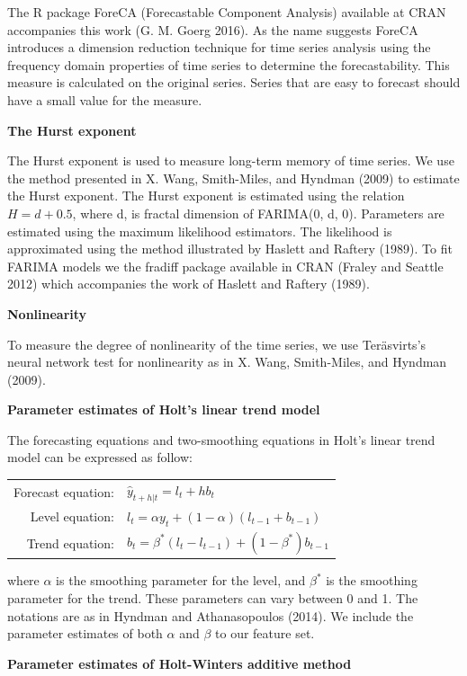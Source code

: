 \documentclass[11pt,]{article}
\theoremstyle{definition}
\theoremstyle{definition}
\theoremstyle{definition}
\theoremstyle{remark}
\begin{document}
The R package ForeCA (Forecastable Component Analysis) available at CRAN
accompanies this work (G. M. Goerg 2016). As the name suggests ForeCA
introduces a dimension reduction technique for time series analysis
using the frequency domain properties of time series to determine the
forecastability. This measure is calculated on the original series.
Series that are easy to forecast should have a small value for the
measure.

\textbf{The Hurst exponent}

The Hurst exponent is used to measure long-term memory of time series.
We use the method presented in X. Wang, Smith-Miles, and Hyndman (2009)
to estimate the Hurst exponent. The Hurst exponent is estimated using
the relation \(H=d+0.5\), where d, is fractal dimension of FARIMA(0, d,
0). Parameters are estimated using the maximum likelihood estimators.
The likelihood is approximated using the method illustrated by Haslett
and Raftery (1989). To fit FARIMA models we the fradiff package
available in CRAN (Fraley and Seattle 2012) which accompanies the work
of Haslett and Raftery (1989).

\textbf{Nonlinearity}

To measure the degree of nonlinearity of the time series, we use
Teräsvirts's neural network test for nonlinearity as in X. Wang,
Smith-Miles, and Hyndman (2009).

\textbf{Parameter estimates of Holt's linear trend model}

The forecasting equations and two-smoothing equations in Holt's linear
trend model can be expressed as follow:

\begin{table}[!h]
\centering
\begin{tabular}{rl}
Forecast equation: &  $\hat{y}_{t+h|t}=l_t + hb_t$ \\
 Level equation: & $l_t = \alpha y_t + (1-\alpha)(l_{t-1}+b_{t-1})$ \\
Trend equation: &  $b_t=\beta^*(l_t-l_{t-1})+(1-\beta^*)b_{t-1}$
\end{tabular}
\end{table}

where \(\alpha\) is the smoothing parameter for the level, and
\(\beta^*\) is the smoothing parameter for the trend. These parameters
can vary between 0 and 1. The notations are as in Hyndman and
Athanasopoulos (2014). We include the parameter estimates of both
\(\alpha\) and \(\beta\) to our feature set.

\textbf{Parameter estimates of Holt-Winters additive method}
\end{document}
